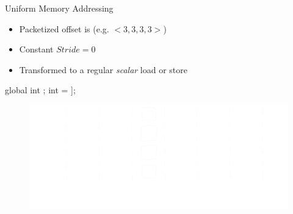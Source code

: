 
\begin{frame}[fragile]{Uniform Memory Addressing}

\begin{itemize}
    \item Packetized offset is  (e.g. $<3, 3, 3, 3>$)
    \item Constant $Stride = 0$
    \item Transformed to a regular \emph{scalar} load or store
\end{itemize}

\begin{minipage}[t]{0.40\linewidth}
    \vspace{0.1ex}
    \begin{codebox}[commandchars=\\\[\]]

global int \uniform[*src];
int \uniform[x] = \uniform[src]\idx[\uniform[3]];






    \end{codebox}
\end{minipage}
\hspace{2em}
\begin{minipage}[t]{0.49\linewidth}
    \vspace{0.6ex}
    \begin{figure}
        \includegraphics[width=1.0\textwidth]{images/uniform-access.pdf}
    \end{figure}
\end{minipage}

\end{frame}


